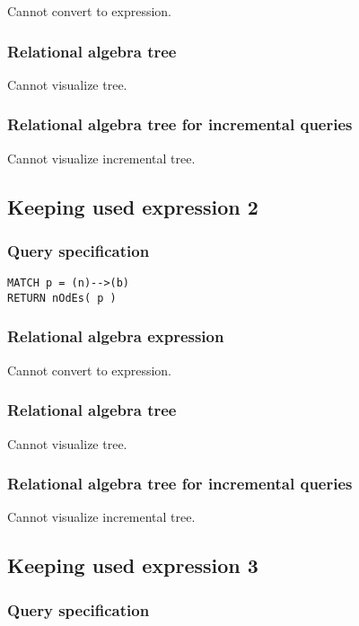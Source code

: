 Cannot convert to expression.

\subsubsection*{Relational algebra tree}

Cannot visualize tree.

\subsubsection*{Relational algebra tree for incremental queries}

Cannot visualize incremental tree.

\subsection{Keeping used expression 2}

\subsubsection*{Query specification}

\begin{lstlisting}
MATCH p = (n)-->(b)
RETURN nOdEs( p )
\end{lstlisting}

\subsubsection*{Relational algebra expression}

Cannot convert to expression.

\subsubsection*{Relational algebra tree}

Cannot visualize tree.

\subsubsection*{Relational algebra tree for incremental queries}

Cannot visualize incremental tree.

\subsection{Keeping used expression 3}

\subsubsection*{Query specification}


